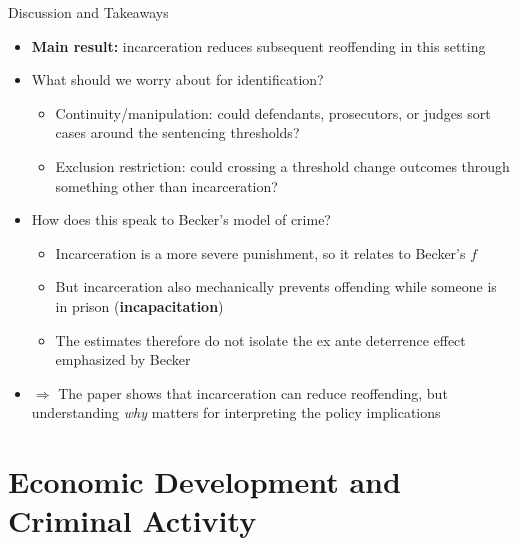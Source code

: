 \documentclass[11pt,notes=hide,aspectratio=169,mathserif]{beamer}
\begin{document}
\begin{frame}{Discussion and Takeaways}
\begin{itemize}
\item \textbf{Main result:} incarceration reduces subsequent reoffending in this setting
\pause \item What should we worry about for identification?
\begin{itemize}
\item Continuity/manipulation: could defendants, prosecutors, or judges sort cases around the sentencing thresholds?
\item Exclusion restriction: could crossing a threshold change outcomes through something other than incarceration?
\end{itemize}
\pause \item How does this speak to Becker's model of crime?
\begin{itemize}
\pause \item Incarceration is a more severe punishment, so it relates to Becker's $f$
\item But incarceration also mechanically prevents offending while someone is in prison (\textbf{incapacitation})
\item The estimates therefore do not isolate the ex ante deterrence effect emphasized by Becker
\end{itemize}
\pause \item $\Rightarrow$ The paper shows that incarceration can reduce reoffending, but understanding \textit{why} matters for interpreting the policy implications
\end{itemize}
\end{frame}



\section{Economic Development and Criminal Activity}
\end{document}

